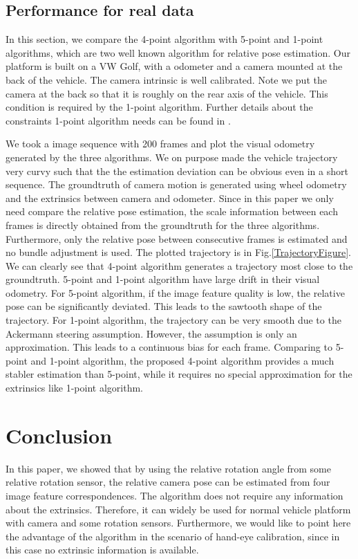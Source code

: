 \documentclass[letterpaper, 10 pt, conference]{ieeeconf}
\begin{document}
\subsection{Performance for real data}

In this section, we compare the 4-point algorithm with 5-point and 1-point  algorithms, which are two well known algorithm for relative pose estimation. Our platform is built on a VW Golf, with a odometer and  a camera mounted at the back of the vehicle. The camera intrinsic is well calibrated. Note we put the camera at the back so that it is roughly on the rear axis of the vehicle. This condition is required by the 1-point algorithm. Further details about the constraints 1-point algorithm needs can be found in \cite{scaramuzza20111}. 

We took a image sequence with 200 frames and plot the visual odometry generated by the three algorithms. We on purpose made the vehicle trajectory very curvy such that the the estimation deviation can be obvious even in a short sequence. The groundtruth of camera motion is generated using wheel odometry and the extrinsics between camera and odometer. Since in this paper we only need compare the relative pose estimation, the scale information between each frames is directly obtained from the groundtruth for the three algorithms. Furthermore, only the relative pose between consecutive frames is estimated and no bundle adjustment is used. The plotted trajectory is in Fig.\ref{TrajectoryFigure}. We can clearly see that 4-point algorithm generates a trajectory most close to the groundtruth. 5-point and 1-point algorithm have large drift in their visual odometry. For 5-point algorithm, if the image feature quality is low, the relative pose can be significantly deviated. This leads to the sawtooth shape of the trajectory. For 1-point algorithm, the trajectory can be very smooth due to the Ackermann steering assumption. However, the assumption is only an approximation. This leads to a continuous bias for each frame. Comparing to 5-point and 1-point algorithm, the proposed 4-point algorithm provides a much stabler estimation than 5-point, while it requires no special approximation for the extrinsics like 1-point algorithm. 


\section{Conclusion}
In this paper, we showed that by using the relative rotation angle from some relative rotation sensor, the relative camera pose can be estimated from four image feature correspondences. The algorithm does not require any information about the extrinsics. Therefore, it can widely be used for normal vehicle platform with camera and some rotation sensors. Furthermore, we would like to point here the advantage of the algorithm in the scenario of hand-eye calibration, since in this case no extrinsic information is available. 
\end{document}
